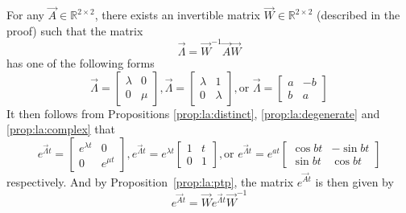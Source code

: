 \begin{corollary}
	For any $\vec A \in \mathbb R^{2 \times 2}$, there exists an invertible matrix $\vec W \in \mathbb R^{2 \times 2}$ (described in the proof) such that the matrix
	\begin{equation*}
		\vec \Lambda = \vec W^{-1} \vec A \vec W
	\end{equation*}
	has one of the following forms
	\begin{equation*}
		\vec \Lambda =
			\begin{bmatrix}
				\lambda & 0 \\
				0 		& \mu
			\end{bmatrix},
		\vec \Lambda = 
			\begin{bmatrix}
				\lambda & 1 \\
				0 		& \lambda
			\end{bmatrix}, \text{or }
		\vec \Lambda = 
			\begin{bmatrix}
				a 	& -b \\
				b 	& a
			\end{bmatrix}
	\end{equation*}
	It then follows from Propositions \ref{prop:la:distinct}, \ref{prop:la:degenerate} and \ref{prop:la:complex} that
	\begin{equation*}
		e^{\vec \Lambda t} =
			\begin{bmatrix}
				e^{\lambda t}	& 0 \\
				0 				& e^{\mu t}
			\end{bmatrix},
		e^{\vec \Lambda t} = 
			e^{\lambda t}
			\begin{bmatrix}
				1 	& t \\
				0 	& 1
			\end{bmatrix}, \text{or }
		e^{\vec \Lambda t} =
			e^{at}
			\begin{bmatrix}
				\cos{bt}	& -\sin{bt} \\
				\sin{bt}	& \cos{bt}
			\end{bmatrix}
	\end{equation*}
	respectively. And by Proposition~\ref{prop:la:ptp}, the matrix $e^{\vec At}$ is then given by
	\begin{equation*}
		e^{\vec At} = \vec W e^{\vec \Lambda t} \vec W^{-1}
	\end{equation*}
\end{corollary}

